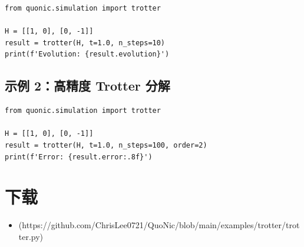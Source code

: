 \documentclass[12pt,a4paper]{article}
\begin{document}
\begin{verbatim}
from quonic.simulation import trotter

H = [[1, 0], [0, -1]]
result = trotter(H, t=1.0, n_steps=10)
print(f'Evolution: {result.evolution}')
\end{verbatim}

\subsection{示例 2：高精度 Trotter 分解}

\begin{verbatim}
from quonic.simulation import trotter

H = [[1, 0], [0, -1]]
result = trotter(H, t=1.0, n_steps=100, order=2)
print(f'Error: {result.error:.8f}')
\end{verbatim}

\section{下载}

\begin{itemize}
  \item [trotter.py](https://github.com/ChrisLee0721/QuoNic/blob/main/examples/trotter/trotter.py)
\end{itemize}
\end{document}
